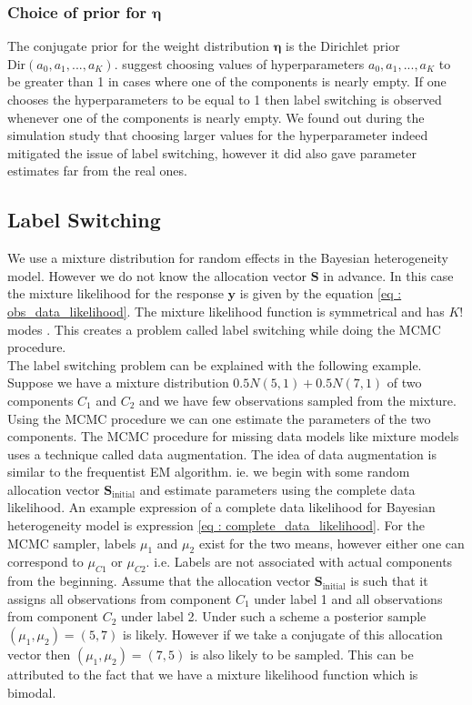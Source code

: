 \subsubsection{Choice of prior for $\boldsymbol{\eta}$}
The conjugate prior for the weight distribution $\boldsymbol{\eta}$ is the Dirichlet prior $\text{Dir}(a_0, a_1,..., a_K)$. \citet[pg. 105]{fruhwirth-schnatter_finite_2013} suggest choosing values of hyperparameters $a_0, a_1,..., a_K$ to be greater than 1 in cases where one of the components is nearly empty. If one chooses the hyperparameters to be equal to 1 then label switching is observed whenever one of the components is nearly empty. We found out during the simulation study that choosing larger values for the hyperparameter indeed mitigated the issue of label switching, however it did also gave parameter estimates far from the real ones. 

\subsection{Label Switching}
We use a mixture distribution for random effects in the Bayesian heterogeneity model. However we do not know the allocation vector $\boldsymbol{S}$ in advance. In this case the mixture likelihood for the response $\boldsymbol{y}$ is given by the equation \ref{eq : obs_data_likelihood}. The mixture likelihood function is symmetrical and has $K!$ modes \citep[pg. 44]{fruhwirth-schnatter_finite_2013}. This creates a problem called label switching while doing the MCMC procedure.\\

The label switching problem can be explained with the following example. Suppose we have a mixture distribution $0.5N(5,1) + 0.5N(7,1)$ of two components $C_1$ and $C_2$ and we have few observations sampled from the mixture. Using the MCMC procedure we can one estimate the parameters of the two components. The MCMC procedure for missing data models like mixture models uses a technique called data augmentation. The idea of data augmentation is similar to the frequentist EM algorithm. ie. we begin with some random allocation vector $\boldsymbol{S}_\text{initial}$ and estimate parameters using the complete data likelihood. An example expression of a complete data likelihood for Bayesian heterogeneity model is expression \ref{eq : complete_data_likelihood}. For the MCMC sampler, labels $\mu_1$ and $\mu_2$ exist for the two means, however either one can correspond to $\mu_{C1}$ or $\mu_{C2}$. i.e. Labels are not associated with actual components from the beginning. Assume that the allocation vector $\boldsymbol{S}_\text{initial}$ is such that it assigns all observations from component $C_1$ under label 1 and all observations from component $C_2$ under label 2. Under such a scheme a posterior sample $(\mu_1,\mu_2) = (5,7)$ is likely. However if we take a conjugate of this allocation vector then $(\mu_1,\mu_2) = (7,5)$ is also likely to be sampled. This can be attributed to the fact that we have a mixture likelihood function which is bimodal.\\

